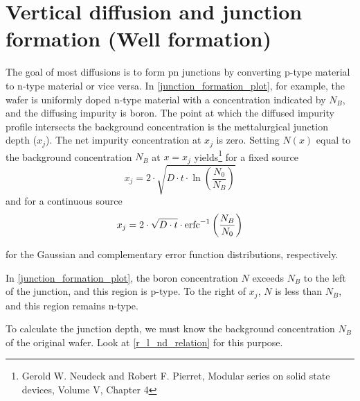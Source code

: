\section{Vertical diffusion and junction formation (Well formation)}\label{building_wells}
The goal of most diffusions is to form pn junctions by converting p-type material to n-type material or vice versa.
In \autoref{junction_formation_plot}, for example, the wafer is uniformly doped n-type material with a concentration indicated by $N_B$, and the diffusing impurity is boron.
The point at which the diffused impurity profile intersects the background concentration is the mettalurgical junction depth ($x_j$).
The net impurity concentration at $x_j$ is zero.
Setting $N(x)$ equal to the background concentration $N_B$ at $x=x_j$ yields\footnote{Gerold W. Neudeck and Robert F. Pierret, Modular series on solid state devices, Volume V, Chapter 4} for a fixed source
\begin{equation}
x_j
=
2 \cdot\sqrt{D \cdot t \cdot \ln\left(\frac{N_0}{N_B}\right)}
\end{equation}
and for a continuous source
\begin{equation}
x_j
=
2 \cdot\sqrt{D \cdot t}
\cdot
\operatorname{erfc}^{-1}\left(\frac{N_B}{N_0}\right)
\end{equation}

for the Gaussian and complementary error function distributions, respectively.

In \autoref{junction_formation_plot}, the boron concentration $N$ exceeds $N_B$ to the left of the junction, and this region is p-type.
To the right of $x_j$, $N$ is less than $N_B$, and this region remains n-type.

To calculate the junction depth, we must know the background concentration $N_B$ of the original wafer.
Look at \autoref{r_l_nd_relation} for this purpose.

